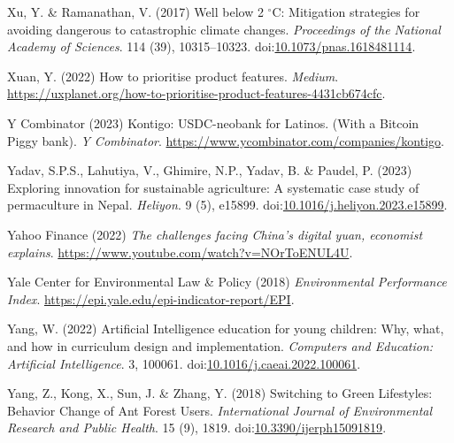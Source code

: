 \documentclass[
  letterpaper,
  DIV=11,
  numbers=noendperiod]{scrartcl}
\newlength{\cslhangindent}
\newenvironment{CSLReferences}[2] %
 {\begin{list}{}{%
  \setlength{\itemindent}{0pt}
  \setlength{\leftmargin}{0pt}
  \setlength{\parsep}{0pt}
  \ifodd #1
   \setlength{\leftmargin}{\cslhangindent}
   \setlength{\itemindent}{-1\cslhangindent}
  \fi
  \setlength{\itemsep}{#2\baselineskip}}}
 {\end{list}}
\begin{document}
\begin{CSLReferences}{0}{1}
Xu, Y. \& Ramanathan, V. (2017) Well below 2 {\(^\circ\)}{C}:
{Mitigation} strategies for avoiding dangerous to catastrophic climate
changes. \emph{Proceedings of the National Academy of Sciences}. 114
(39), 10315--10323.
doi:\href{https://doi.org/10.1073/pnas.1618481114}{10.1073/pnas.1618481114}.

Xuan, Y. (2022) How to prioritise product features. \emph{Medium}.
\url{https://uxplanet.org/how-to-prioritise-product-features-4431cb674cfc}.

Y Combinator (2023) Kontigo: {USDC-neobank} for {Latinos}. ({With} a
{Bitcoin Piggy} bank). \emph{Y Combinator}.
\url{https://www.ycombinator.com/companies/kontigo}.

Yadav, S.P.S., Lahutiya, V., Ghimire, N.P., Yadav, B. \& Paudel, P.
(2023) Exploring innovation for sustainable agriculture: {A} systematic
case study of permaculture in {Nepal}. \emph{Heliyon}. 9 (5), e15899.
doi:\href{https://doi.org/10.1016/j.heliyon.2023.e15899}{10.1016/j.heliyon.2023.e15899}.

Yahoo Finance (2022) \emph{The challenges facing {China}'s digital yuan,
economist explains}. \url{https://www.youtube.com/watch?v=NOrToENUL4U}.

Yale Center for Environmental Law \& Policy (2018) \emph{Environmental
{Performance Index}}.
\url{https://epi.yale.edu/epi-indicator-report/EPI}.

Yang, W. (2022) Artificial {Intelligence} education for young children:
{Why}, what, and how in curriculum design and implementation.
\emph{Computers and Education: Artificial Intelligence}. 3, 100061.
doi:\href{https://doi.org/10.1016/j.caeai.2022.100061}{10.1016/j.caeai.2022.100061}.

Yang, Z., Kong, X., Sun, J. \& Zhang, Y. (2018) Switching to {Green
Lifestyles}: {Behavior Change} of {Ant Forest Users}.
\emph{International Journal of Environmental Research and Public
Health}. 15 (9), 1819.
doi:\href{https://doi.org/10.3390/ijerph15091819}{10.3390/ijerph15091819}.


\end{CSLReferences}
\end{document}
